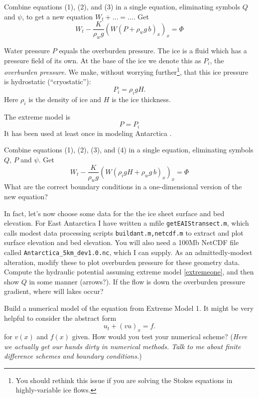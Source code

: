 \documentclass[12pt,final]{amsart}%
\begin{document}
Combine equations (1), (2), and (3) in a single equation, eliminating symbols $Q$ and $\psi$, to get a new equation $W_t + \dots = \dots$.  Get
  $$W_t - \frac{K}{\rho_w g} \left(W \left(P + \rho_w g\, b\right)_x\right)_x = \Phi$$

Water pressure $P$ equals the overburden pressure.  The ice is a fluid which has a pressure field of its own.  At the base of the ice we denote this as $P_i$, the \emph{overburden pressure}.  We make, without worrying further\footnote{You should rethink this issue if you are solving the Stokes equations in highly-variable ice flows.}, that this ice pressure is hydrostatic (``cryostatic''):
	$$P_i = \rho_i g H.$$
Here $\rho_i$ is the density of ice and $H$ is the ice thickness.

The extreme model is
\begin{equation}
P=P_i \label{extremeone}
\end{equation}
It has been used at least once in modeling Antarctica \citep{LeBrocqetal2009}.

Combine equations (1), (2), (3), and (4) in a single equation, eliminating symbols $Q$, $P$ and $\psi$.  Get  
  $$W_t - \frac{K}{\rho_w g} \left(W \left(\rho_i g H + \rho_w g\, b\right)_x\right)_x = \Phi$$
What are the correct boundary conditions in a one-dimensional version of the new equation?

In fact, let's now choose some data for the the ice sheet surface and bed elevation.  For East Antarctica I have written a mfile \texttt{getEAIStransect.m}, which calls modest data processing scripts \texttt{buildant.m,netcdf.m} to extract and plot surface elevation and bed elevation.  You will also need a 100Mb NetCDF file called \texttt{Antarctica\_5km\_dev1.0.nc}, which I can supply.  As an admittedly-modest alteration, modify these to plot overburden pressure for these geometry data.  Compute the hydraulic potential assuming extreme model \eqref{extremeone}, and then show $Q$ in some manner (arrows?).  If the flow is down the overburden pressure gradient, where will lakes occur?


Build a numerical model of the equation from Extreme Model 1.  It might be very helpful to consider the abstract form
	$$u_t + (v u)_x = f.$$
for $v(x)$ and $f(x)$ given.  How would you test your numerical scheme?  (\emph{Here we actually get our hands dirty in numerical methods.  Talk to me about finite difference schemes and boundary conditions.})




\small

\end{document}
